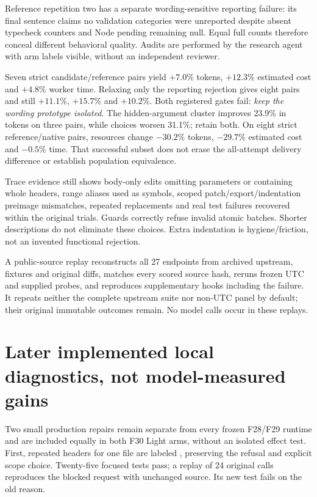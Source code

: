 \documentclass[11pt,a4paper]{article}
\newcommand{\code}[1]{\texttt{\detokenize{#1}}}
\begin{document}
Reference repetition two has a separate wording-sensitive reporting failure:
its final sentence claims no validation categories were unreported despite
absent typecheck counters and Node pending remaining null. Equal full counts
therefore conceal different behavioral quality. Audits are performed by the
research agent with arm labels visible, without an independent reviewer.

Seven strict candidate/reference pairs yield $+7.0\%$ tokens, $+12.3\%$ estimated
cost and $+4.8\%$ worker time. Relaxing only the reporting rejection gives eight
pairs and still $+11.1\%$, $+15.7\%$ and $+10.2\%$. Both registered gates fail:
\emph{keep the wording prototype isolated}. The hidden-argument cluster improves
23.9\% in tokens on three pairs, while choices worsen 31.1\%; retain both.
On eight strict reference/native pairs, resources change $-30.2\%$ tokens,
$-29.7\%$ estimated cost and $-0.5\%$ time. That successful subset does not erase
the all-attempt delivery difference or establish population equivalence.

Trace evidence still shows body-only edits omitting parameters or containing
whole headers, range aliases used as symbols, scoped patch/export/indentation
preimage mismatches, repeated replacements and real test failures recovered
within the original trials. Guards correctly refuse invalid atomic batches.
Shorter descriptions do not eliminate these choices. Extra indentation is
hygiene/friction, not an invented functional rejection.

A public-source replay reconstructs all 27 endpoints from archived upstream,
fixtures and original diffs, matches every scored source hash, reruns frozen UTC
and supplied probes, and reproduces supplementary hooks including the failure.
It repeats neither the complete upstream suite nor non-UTC panel by default;
their original immutable outcomes remain. No model calls occur in these replays.

\section{Later implemented local diagnostics, not model-measured gains}
Two small production repairs remain separate from every frozen F28/F29 runtime
and are included equally in both F30 Light arms, without an isolated effect test.
First, repeated \code{Update File} headers for one file are labeled
\code{multiple_headers_for_symbol}, preserving the refusal and explicit scope
choice. Twenty-five focused tests pass; a replay of 24 original calls reproduces
the blocked request with unchanged source. Its new test fails on the old reason.
\end{document}
